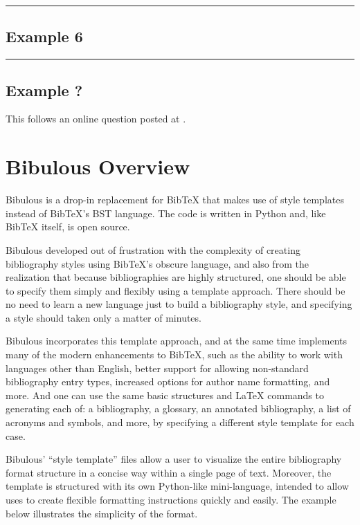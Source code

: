 \documentclass[letterpaper,10pt,english]{sphinxmanual}
\begin{document}
\bigskip\hrule{}\bigskip



\section{Example 6}
\label{examples:example-6}

\bigskip\hrule{}\bigskip



\section{Example ?}
\label{examples:example}
This follows an online question posted at .


\chapter{Bibulous Overview}
\label{index:bibulous-overview}
Bibulous is a drop-in replacement for BibTeX that makes use of style templates instead of BibTeX's BST language. The code is written in Python and, like BibTeX itself, is open source.

Bibulous developed out of frustration with the complexity of creating bibliography styles using BibTeX's obscure language, and also from the realization that because bibliographies are highly structured, one should be able to specify them simply and flexibly using a template approach. There should be no need to learn a new language just to build a bibliography style, and specifying a style should taken only a matter of minutes.

Bibulous incorporates this template approach, and at the same time implements many of the modern enhancements to BibTeX, such as the ability to work with languages other than English, better support for allowing non-standard bibliography entry types, increased options for author name formatting, and more. And one can use the same basic structures and LaTeX commands to generating each of: a bibliography, a glossary, an annotated bibliography, a list of acronyms and symbols, and more, by specifying a different style template for each case.

Bibulous' “style template” files allow a user to visualize the entire bibliography format structure in a concise way within a single page of text. Moreover, the template is structured with its own Python-like mini-language, intended to allow uses to create flexible formatting instructions quickly and easily. The example below illustrates the simplicity of the format.
\end{document}
